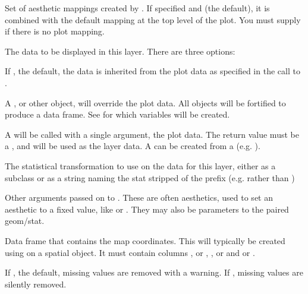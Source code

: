 \documentclass[a4paper]{book}
\begin{document}
%
\begin{Arguments}
\begin{ldescription}
\item[\code{mapping}] Set of aesthetic mappings created by . If specified and
 (the default), it is combined with the default mapping
at the top level of the plot. You must supply  if there is no plot
mapping.

\item[\code{data}] The data to be displayed in this layer. There are three
options:

If , the default, the data is inherited from the plot
data as specified in the call to .

A , or other object, will override the plot
data. All objects will be fortified to produce a data frame. See
 for which variables will be created.

A  will be called with a single argument,
the plot data. The return value must be a , and
will be used as the layer data. A  can be created
from a  (e.g. ).

\item[\code{stat}] The statistical transformation to use on the data for this
layer, either as a   subclass or as a string naming the
stat stripped of the  prefix (e.g.  rather than
)

\item[\code{...}] Other arguments passed on to . These are
often aesthetics, used to set an aesthetic to a fixed value, like
 or . They may also be parameters
to the paired geom/stat.

\item[\code{map}] Data frame that contains the map coordinates.  This will
typically be created using  on a spatial object.
It must contain columns ,  or ,
,  or  and  or .

\item[\code{na.rm}] If , the default, missing values are removed with
a warning. If , missing values are silently removed.


\end{ldescription}
\end{Arguments}
\end{document}
